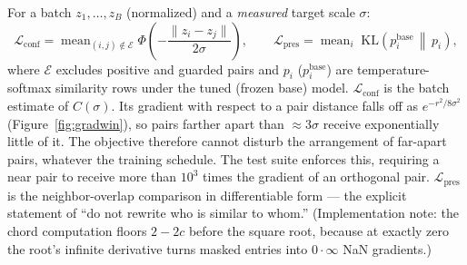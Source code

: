 \documentclass[11pt,letterpaper]{article}
\begin{document}
For a batch $z_1,\dots,z_B$ (normalized) and a \emph{measured} target scale
$\sigma$:
\[
\mathcal L_{\mathrm{conf}}
= \mathop{\mathrm{mean}}_{(i,j) \notin \mathcal E}
  \Phi\!\left(-\frac{\lVert z_i - z_j\rVert}{2\sigma}\right),
\qquad
\mathcal L_{\mathrm{pres}}
= \mathop{\mathrm{mean}}_i \;
  \mathrm{KL}\!\left(p^{\mathrm{base}}_i \,\middle\|\, p_i\right),
\]
where $\mathcal E$ excludes positive and guarded pairs and $p_i$
($p^{\mathrm{base}}_i$) are temperature-softmax similarity rows under the
tuned (frozen base) model. $\mathcal L_{\mathrm{conf}}$ is the batch
estimate of $C(\sigma)$. Its gradient with respect to a pair distance
falls off as $e^{-r^2/8\sigma^2}$ (Figure~\ref{fig:gradwin}), so pairs
farther apart than $\approx 3\sigma$ receive exponentially little of it.
The objective therefore cannot disturb the arrangement of far-apart pairs,
whatever the training schedule. The test suite enforces this, requiring a
near pair to receive more than $10^3$ times the gradient of an orthogonal
pair. $\mathcal L_{\mathrm{pres}}$ is the neighbor-overlap comparison in
differentiable form --- the explicit statement of ``do not rewrite who is
similar to whom.'' (Implementation note: the chord computation floors $2 -
2c$ before the square root, because at exactly zero the root's infinite
derivative turns masked entries into $0 \cdot \infty$ NaN gradients.)
\end{document}
